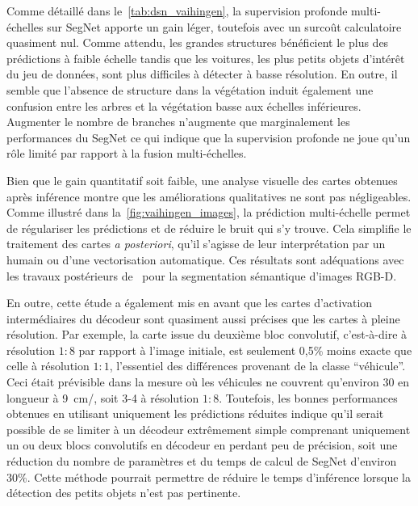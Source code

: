 Comme détaillé dans le~\cref{tab:dsn_vaihingen}, la supervision profonde multi-échelles sur SegNet apporte un gain léger, toutefois avec un surcoût calculatoire quasiment nul. Comme attendu, les grandes structures bénéficient le plus des prédictions à faible échelle tandis que les voitures, les plus petits objets d'intérêt du jeu de données, sont plus difficiles à détecter à basse résolution. En outre, il semble que l'absence de structure dans la végétation induit également une confusion entre les arbres et la végétation basse aux échelles inférieures. Augmenter le nombre de branches n'augmente que marginalement les performances du SegNet ce qui indique que la supervision profonde ne joue qu'un rôle limité par rapport à la fusion multi-échelles.

Bien que le gain quantitatif soit faible, une analyse visuelle des cartes obtenues après inférence montre que les améliorations qualitatives ne sont pas négligeables. Comme illustré dans la~\cref{fig:vaihingen_images}, la prédiction multi-échelle permet de régulariser les prédictions et de réduire le bruit qui s'y trouve. Cela simplifie le traitement des cartes \emph{a posteriori}, qu'il s'agisse de leur interprétation par un humain ou d'une vectorisation automatique. Ces résultats sont adéquations avec les travaux postérieurs de~\citet{jiang_rednet_2018} pour la segmentation sémantique d'images \gls{RGB-D}.

En outre, cette étude a également mis en avant que les cartes d'activation intermédiaires du décodeur sont quasiment aussi précises que les cartes à pleine résolution. Par exemple, la carte issue du deuxième bloc convolutif, c'est-à-dire à résolution $1:8$ par rapport à l'image initiale, est seulement 0,5\% moins exacte que celle à résolution $1:1$, l'essentiel des différences provenant de la classe ``véhicule''. Ceci était prévisible dans la mesure où les véhicules ne couvrent qu'environ \SI{30}{\px} en longueur à \SI{9}{\centi\meter/\px}, soit 3-\SI{4}{\px} à résolution $1:8$. Toutefois, les bonnes performances obtenues en utilisant uniquement les prédictions réduites indique qu'il serait possible de se limiter à un décodeur extrêmement simple comprenant uniquement un ou deux blocs convolutifs en décodeur en perdant peu de précision, soit une réduction du nombre de paramètres et du temps de calcul de SegNet d'environ 30\%. Cette méthode pourrait permettre de réduire le temps d'inférence lorsque la détection des petits objets n'est pas pertinente.


